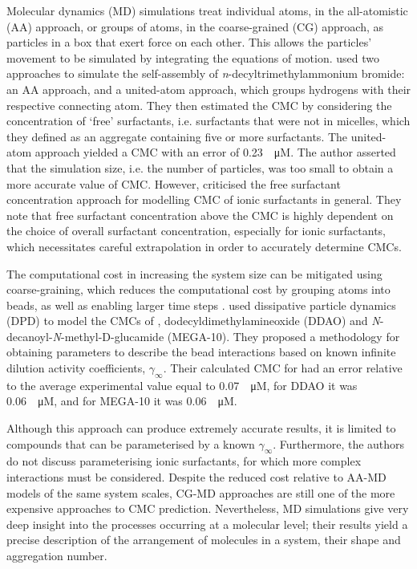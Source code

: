 Molecular dynamics (MD) simulations treat individual atoms, in the all-atomistic
(AA) approach, or groups of atoms, in the coarse-grained (CG) approach, as
particles in a box that exert force on each other. This allows the particles'
movement to be simulated by integrating the equations of motion.
\citet{jorgeMolecularDynamicsSimulation2008} used two approaches to simulate the
self-assembly of \textit{n}-decyltrimethylammonium bromide: an AA approach, and
a united-atom approach, which groups hydrogens with their respective connecting
atom. They then estimated the CMC by considering the concentration of `free'
surfactants, i.e. surfactants that were not in micelles, which they defined as
an aggregate containing five or more surfactants. The united-atom approach
yielded a CMC with an error of \SI{0.23}{\log \micro M}. The author asserted
that the simulation size, i.e. the number of particles, was too small to obtain
a more accurate value of CMC. However,
\citet{jusufiExplicitImplicitSolventSimulations2015} criticised the free
surfactant concentration approach for modelling CMC of ionic surfactants in
general. They note that free surfactant concentration above the CMC is highly
dependent on the choice of overall surfactant concentration, especially for
ionic surfactants, which necessitates careful extrapolation in order to
accurately determine CMCs.

The computational cost in increasing the system size can be mitigated using
coarse-graining, which reduces the computational cost by grouping atoms into
beads, as well as enabling larger time steps
\cite{fitzgeraldMultiscaleModelingNanomaterials2015}.
\citet{vishnyakovPredictionCriticalMicelle2013} used dissipative particle
dynamics (DPD) to model the CMCs of , dodecyldimethylamineoxide (DDAO)
and \textit{N}-decanoyl-\textit{N}-methyl-\textsc{D}-glucamide (MEGA-10). They
proposed a methodology for obtaining parameters to describe the bead
interactions based on known infinite dilution activity coefficients,
$\gamma_\infty$. Their calculated CMC for  had an error relative to the
average experimental value equal to \SI{0.07}{\log \micro M}, for DDAO it was
\SI{0.06}{\log \micro M}, and for MEGA-10 it was \SI{0.06}{\log \micro M}.

Although this approach can produce extremely accurate results, it is limited to
compounds that can be parameterised by a known $\gamma_\infty$. Furthermore, the
authors do not discuss parameterising ionic surfactants, for which more complex
interactions must be considered. Despite the reduced cost relative to AA-MD
models of the same system scales, CG-MD approaches are still one of the more
expensive approaches to CMC prediction. Nevertheless, MD simulations give very
deep insight into the processes occurring at a molecular level; their results
yield a precise description of the arrangement of molecules in a system, their
shape and aggregation number.

